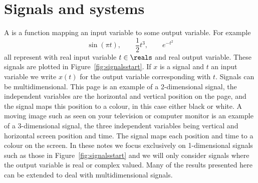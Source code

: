 \chapter{Signals and systems}

A  is a function mapping an input variable to some output variable.  For example
\[
\sin( \pi t), \qquad \frac{1}{2} t^3, \qquad e^{-t^2}
\]
all represent  with real input variable $t \in \reals$ and real output variable. These signals are plotted in Figure~\ref{fig:signalsstart}.  If $x$ is a signal and $t$ an input variable we write $x(t)$ for the output variable corresponding with $t$.  Signals can be multidimensional.  This page is an example of a 2-dimensional signal, the independent variables are the horizontal and vertical position on the page, and the signal maps this position to a colour, in this case either black or white.  A moving image such as seen on your television or computer monitor is an example of a 3-dimensional signal, the three independent variables being vertical and horizontal screen position and time.  The signal maps each position and time to a colour on the screen.  %
In these notes we focus exclusively on 1-dimensional signals such as those in Figure~\ref{fig:signalsstart} and we will only consider signals where the output variable is real or complex valued.  Many of the results presented here can be extended to deal with multidimensional signals.



